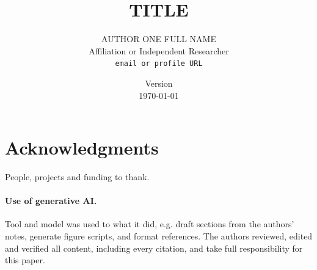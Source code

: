 \documentclass[11pt]{article}
\title{{{TITLE}}}
\author{
    {{AUTHOR ONE FULL NAME}} \\
    {{Affiliation or Independent Researcher}} \\
    \texttt{{{email or profile URL}}}
}
\date{Version \paperversion \\ \today}
\begin{document}
\maketitle




% 
% 

\section*{Acknowledgments}
{{People, projects and funding to thank.}}

\paragraph{Use of generative AI.}
{{Tool and model}} was used to {{what it did, e.g. draft sections from the authors' notes,
generate figure scripts, and format references}}. The authors reviewed, edited and
verified all content, including every citation, and take full responsibility for this
paper.



\end{document}
